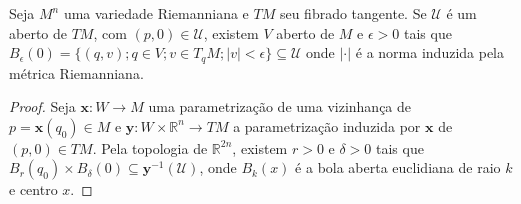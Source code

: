 \begin{lemma}
    \label{lem:topologia-fibrado-tangente}
    Seja $M^{n}$ uma variedade Riemanniana e $TM$ seu fibrado tangente. Se $\mathcal{U}$ é um aberto de $TM$, com $(p,0)\in \mathcal{U}$, existem $V$ aberto de $M$ e $\epsilon>0$ tais que $B_{\epsilon}(0)=\{ (q,v);q \in V; v \in T_{q}M;|v|<\epsilon\} \subseteq \mathcal{U}$ onde $|\cdot|$ é a norma induzida pela métrica Riemanniana.
    \begin{proof}

        Seja $\mathbf{x}:W\to M$ uma parametrização de uma vizinhança de $p=\mathbf{x}(q_{0}) \in M$ e $\mathbf{y}:W\times \mathbb{R}^{n}\to TM$ a parametrização induzida por $\mathbf{x}$ de $(p,0)\in TM$.
        Pela topologia de $\mathbb{R}^{2n}$, existem $r>0$ e $\delta>0$ tais que $B_{r}(q_{0})\times B_{\delta}(0)\subseteq \mathbf{y}^{-1}(\mathcal{U})$, onde $B_{k}(x)$ é a bola aberta euclidiana de raio $k$ e centro $x$.


\end{proof}
\end{lemma}
